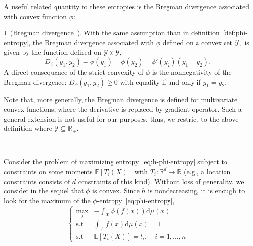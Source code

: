 \documentclass[english,sort&compress]{elsarticle}
\theoremstyle{definition}
\newtheorem{defn}{\protect\definitionname}
\theoremstyle{plain}
\theoremstyle{plain}
\providecommand{\definitionname}{Definition}
\def\dmu{\mathrm{d}\mu}
\def\Rset{\mathbb{R}}
\def\X{\mathcal{X}}
\def\Y{\mathcal{Y}}
\newcommand{\Esp}[1]{\mathbb{E}\left[ #1 \right]}
\begin{document}
A  useful  related  quantity  to  these  entropies  is  the  Bregman  divergence
associated with convex function $\phi$:
%
\begin{defn}[Bregman divergence~\cite{Bre67, Bas13}]
\label{def:Bregman}
  With the same assumption than in definition~\ref{def:phi-entropy}, the Bregman
  divergence  associated with $\phi$  defined on  a  convex set  $\Y,$ is
  given by the function defined on $\Y \times \Y$,
  \begin{equation}\label{eq:Bregman}
    D_\phi(y_1,y_2) = \phi(y_1) - \phi(y_2) - \phi'(y_2) \left(y_1-y_2\right).
  \end{equation}
  A direct consequence of the strict convexity of $\phi$ is the nonnegativity of
  the Bregman divergence:  $D_\phi(y_1,y_2) \ge 0$ with equality  if and only if
  $y_1 = y_2$.
\end{defn}

Note that,  more generally, the  Bregman divergence is defined  for multivariate
convex functions, where the derivative  is replaced by gradient operator. Such a
general extension  is not  useful for  our purposes, thus,  we restrict  to the
above definition where $\Y \subseteq \Rset_+$.

\

Consider the  problem of maximizing  entropy~\eqref{eq:h-phi-entropy} subject to
constraints  on some moments  $\Esp{T_i(X)}$ with  $T_i: \Rset^d  \mapsto \Rset$
(e.g.,   a  location   constraints  consists   of  $d$   constraints   of  this
kind). Without  loss of  generality, we  consider in the  sequel that  $\phi$ is
convex.  Since $h$ is nondecreasing, it is enough to look for the maximum of the
$\phi$-entropy~\eqref{eq:phi-entropy},
%
\begin{equation}\label{eq:MaxEnt}
\begin{cases}
\max_f & \displaystyle - \int_\X \phi(f(x)) \dmu(x)\\[5mm]
\text{s.t. } & \displaystyle \int_\X f(x) \dmu(x) = 1\\[5mm]
\text{s.t. } & \Esp{T_i(X)} = t_i, \quad i=1,\ldots,n
\end{cases}
\end{equation}
\end{document}

